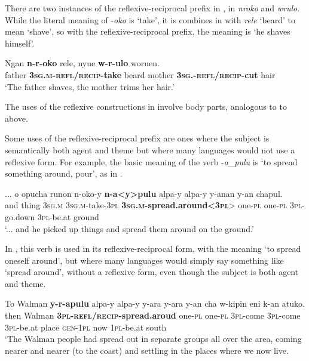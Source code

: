 \documentclass[output=paper]{langscibook}
\begin{document}
There are two instances of the reflexive-reciprocal prefix in , in \emph{nroko} and \emph{wrulo}. While the literal meaning of -\emph{oko} is ‘take’, it is combines in  with \emph{rele} ‘beard’ to mean ‘shave’, so with the reflexive-reciprocal prefix, the meaning is ‘he shaves himself’. 

\ea%
    \label{ex:Brown:28}
    \gll Ngan  \textbf{n-r-oko}  rele,  nyue  \textbf{w-r-ulo}  woruen.\\
        father  \textbf{\textsc{3sg.m}}\textbf{{}-}\textbf{\textsc{refl/recip}}\textbf{{}-take}  beard  mother  \textbf{\textsc{3sg.-refl/recip}}\textbf{{}-cut}  hair\\
    \glt  ‘The father shaves, the mother trims her hair.’
    \z

 
The uses of the reflexive constructions in  involve body parts, analogous to  to  above.

  Some uses of the reflexive-reciprocal prefix are ones where the subject is semantically both agent and theme but where many languages would not use a reflexive form. For example, the basic meaning of the verb -\emph{a\_pulu} is ‘to spread something around, pour’, as in .


\ea%
    \label{ex:Brown:29}
    \gll ...  o  opucha  runon  n-oko-y  \textbf{n-a<y>pulu} alpa-y  alpa-y  y-anan  y-an  chapul.\\
   { } and  thing  \textsc{3sg.m}  \textsc{3sg.m}{}-take-\textsc{3pl}  \textbf{\textsc{3sg.m}}\textbf{{}-spread.around<}\textbf{\textsc{3pl}}> one-\textsc{pl}  one-\textsc{pl}  \textsc{3pl}{}-go.down  \textsc{3pl}{}-be.at  ground\\
    \glt 
  ‘... and he picked up things and spread them around on the ground.’
    \z

In , this verb is used in its reflexive-reciprocal form, with the meaning ‘to spread oneself around’, but where many languages would simply say something like ‘spread around’, without a reflexive form, even though the subject is both agent and theme.


\ea%
    \label{ex:Brown:30}
    \gll To  Walman  \textbf{y-r-apulu}  alpa-y  alpa-y  y-ara  y-ara  y-an  cha  w-kipin  eni  k-an  atuko.\\
         then  Walman  \textbf{\textsc{3pl}}\textbf{{}-}\textbf{\textsc{refl/recip}}\textbf{{}-spread.aroud}  one-\textsc{pl}  one-\textsc{pl}  \textsc{3pl}{}-come  \textsc{3pl}{}-come  \textsc{3pl}{}-be.at  place  \textsc{gen}{}-\textsc{1pl}  now  \textsc{1pl}{}-be.at  south\\
    \glt ‘The Walman people had spread out in separate groups all over the area, coming nearer and nearer (to the coast) and settling in the places where we now live.
    \z
\end{document}
